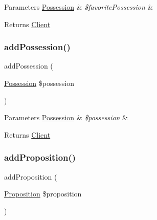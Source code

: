\begin{DoxyParams}[1]{Parameters}
\mbox{\hyperlink{class_app_1_1_entity_1_1_possession}{Possession}} & {\em \$favorite\+Possession} & \\
\hline
\end{DoxyParams}
\begin{DoxyReturn}{Returns}
\mbox{\hyperlink{class_app_1_1_entity_1_1_client}{Client}} 
\end{DoxyReturn}
\mbox{\label{class_app_1_1_entity_1_1_client_a5188d786a9c3e2f2936d783276947acc}} 
\subsubsection{\texorpdfstring{addPossession()}{addPossession()}}
{\footnotesize\ttfamily add\+Possession (\begin{DoxyParamCaption}\item[{\mbox{\hyperlink{class_app_1_1_entity_1_1_possession}{Possession}}}]{\$possession }\end{DoxyParamCaption})}


\begin{DoxyParams}[1]{Parameters}
\mbox{\hyperlink{class_app_1_1_entity_1_1_possession}{Possession}} & {\em \$possession} & \\
\hline
\end{DoxyParams}
\begin{DoxyReturn}{Returns}
\mbox{\hyperlink{class_app_1_1_entity_1_1_client}{Client}} 
\end{DoxyReturn}
\mbox{\label{class_app_1_1_entity_1_1_client_a0fb37c482d114bb0ddea86771b806277}} 
\subsubsection{\texorpdfstring{addProposition()}{addProposition()}}
{\footnotesize\ttfamily add\+Proposition (\begin{DoxyParamCaption}\item[{\mbox{\hyperlink{class_app_1_1_entity_1_1_proposition}{Proposition}}}]{\$proposition }\end{DoxyParamCaption})}


